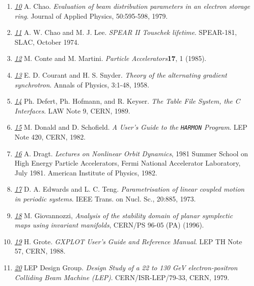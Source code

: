 \begin{enumerate}
   \item \href{chao}{\textit{10}} A. Chao. \textit{Evaluation of beam
     distribution parameters in an electron   storage ring}. Journal of
     Applied Physics, 50:595-598, 1979.  


   \item \href{chao1}{\textit{11}} A. W. Chao and
     M. J. Lee. \textit{SPEAR II Touschek lifetime}. SPEAR-181, SLAC,
     October 1974.  


   \item \href{conte}{\textit{12}} M. Conte and
     M. Martini. \textit{Particle Accelerators}\textbf{17}, 1 (1985).  


   \item \href{courant}{\textit{13}} E. D. Courant and
     H. S. Snyder. \textit{Theory of the alternating gradient
       synchrotron}. Annals of Physics, 3:1-48, 1958.  


   \item \href{tfs}{\textit{14}} Ph. Defert, Ph. Hofmann, and
     R. Keyser. \textit{The Table File System, the C Interfaces}. LAW
     Note 9, CERN, 1989.  


   \item \href{donald}{\textit{15}} M. Donald and
     D. Schofield. \textit{A User's Guide to the \texttt{HARMON}
       Program}. LEP Note 420, CERN, 1982.  


   \item \href{dragt}{\textit{16}} A. Dragt. \textit{Lectures on
     Nonlinear Orbit Dynamics}, 1981 Summer School on High   Energy
     Particle Accelerators, Fermi National Accelerator Laboratory, July
     1981. American Institute of Physics, 1982.  


   \item \href{edwards}{\textit{17}} D. A. Edwards and
     L. C. Teng. \textit{Parametrisation of linear coupled motion in
       periodic systems}. IEEE Trans. on Nucl. Sc., 20:885, 1973.  


   \item \href{giovanozzi}{\textit{18}} M. Giovannozzi, \textit{Analysis
     of the stability domain of planar symplectic maps using invariant
     manifolds}, CERN/PS 96-05 (PA) (1996).  


   \item \href{gxplot}{\textit{19}} H. Grote. \textit{GXPLOT User's
     Guide and Reference Manual}. LEP TH Note 57, CERN, 1988.  


   \item \href{lep}{\textit{20}} LEP Design Group. \textit{Design Study
     of a 22 to 130 GeV electron-positron Colliding Beam Machine
     (LEP)}. CERN/ISR-LEP/79-33, CERN, 1979.  



\end{enumerate}

